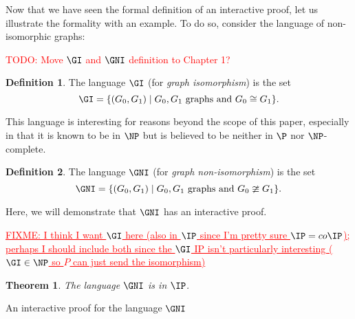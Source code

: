 \documentclass[english,12pt]{reedthesis}
\theoremstyle{plain}
\newtheorem{thm}{Theorem}[section]
\theoremstyle{definition}
\newtheorem{defn}[defn]{Definition}
\theoremstyle{remark}
\DeclarePairedDelimiter{\abs}{\lvert}{\rvert}
\newcommand{\TODO}[1]{\textcolor{red}{TODO: #1}}
\newcommand{\FIXME}[1]{\textcolor{red}{\ul{FIXME: #1}}}
\begin{document}
Now that we have seen the formal definition of an interactive proof, let us
illustrate the formality with an example. To do so, consider the language of
non-isomorphic graphs:

\TODO{Move $\GI$ and $\GNI$ definition to Chapter 1?}
\begin{defn}\label{def:gi}
  The language $\GI$ (for \emph{graph isomorphism}) is the set
  \[
    \GI = \{(G_{0}, G_{1}) \mid G_{0}, G_{1} \text{ graphs and } G_{0} \cong G_{1}\}.
  \]
\end{defn}

This language is interesting for reasons beyond the scope of this paper,
especially in that it is known to be in $\NP$ but is believed to be neither in
$\P$ nor $\NP$-complete.

\begin{defn}\label{def:gni}
  The language $\GNI$ (for \emph{graph non-isomorphism}) is the set
  \[
    \GNI = \{(G_{0}, G_{1}) \mid G_{0}, G_{1} \text{ graphs and } G_{0} \ncong G_{1}\}.
  \]
\end{defn}

Here, we will demonstrate that $\GNI$ has an interactive proof.

\FIXME{I think I want $\GI$ here (also in $\IP$ since I'm pretty sure
  $\IP = co\IP$); perhaps I should include both since the $\GI$ IP isn't
  particularly interesting ($\GI \in \NP$ so $P$ can just send the isomorphism)}
\begin{thm}\label{thm:gni-ip}
  The language $\GNI$ is in $\IP$.
\end{thm}

\begin{algorithm}[htbp]
  \Accept\;
  \caption{An interactive proof for the language $\GNI$}\label{alg:gni-ip}
\end{algorithm}
\end{document}
